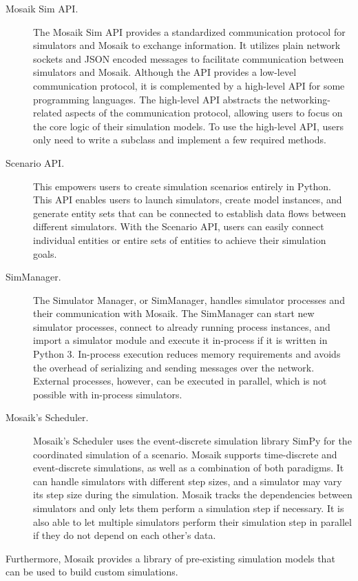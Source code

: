 \begin{description}

    \item[Mosaik Sim API.] The Mosaik Sim API provides a standardized
        communication protocol for simulators and Mosaik to exchange
        information. It utilizes plain network sockets and JSON encoded messages
        to facilitate communication between simulators and Mosaik. Although the
        API provides a low-level communication protocol, it is complemented by a
        high-level API for some programming languages. The high-level API
        abstracts the networking-related aspects of the communication protocol,
        allowing users to focus on the core logic of their simulation models. To
        use the high-level API, users only need to write a subclass and
        implement a few required methods.

    \item[Scenario API.] This empowers users to create simulation scenarios
        entirely in Python. This API enables users to launch simulators, create
        model instances, and generate entity sets that can be connected to
        establish data flows between different simulators. With the Scenario
        API, users can easily connect individual entities or entire sets of
        entities to achieve their simulation goals.

    \item[SimManager.] The Simulator Manager, or SimManager, handles simulator
        processes and their communication with Mosaik. The SimManager can start
        new simulator processes, connect to already running process instances,
        and import a simulator module and execute it in-process if it is written
        in Python 3. In-process execution reduces memory requirements and avoids
        the overhead of serializing and sending messages over the network.
        External processes, however, can be executed in parallel, which is not
        possible with in-process simulators.

    \item[Mosaik's Scheduler.] Mosaik's Scheduler uses the event-discrete
        simulation library SimPy for the coordinated simulation of a scenario.
        Mosaik supports time-discrete and event-discrete simulations, as well as
        a combination of both paradigms. It can handle simulators with different
        step sizes, and a simulator may vary its step size during the
        simulation. Mosaik tracks the dependencies between simulators and only
        lets them perform a simulation step if necessary. It is also able to let
        multiple simulators perform their simulation step in parallel if they do
        not depend on each other's data.

\end{description}
Furthermore, Mosaik provides a library of pre-existing simulation models that
can be used to build custom simulations.

